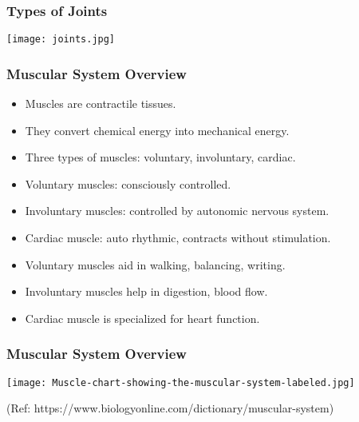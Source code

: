 \begin{frame}[fragile]\frametitle{Types of Joints}

		\begin{center}
		\texttt{[image: joints.jpg]} 
		\end{center}	

\end{frame}

\begin{frame}[fragile]\frametitle{Muscular System Overview}

      \begin{itemize}
		\item Muscles are contractile tissues.
		\item They convert chemical energy into mechanical energy.
		\item Three types of muscles: voluntary, involuntary, cardiac.
		\item Voluntary muscles: consciously controlled.
		\item Involuntary muscles: controlled by autonomic nervous system.
		\item Cardiac muscle: auto rhythmic, contracts without stimulation.
		\item Voluntary muscles aid in walking, balancing, writing.
		\item Involuntary muscles help in digestion, blood flow.
		\item Cardiac muscle is specialized for heart function.
	  \end{itemize}

\end{frame}

\begin{frame}[fragile]\frametitle{Muscular System Overview}

		\begin{center}
		\texttt{[image: Muscle-chart-showing-the-muscular-system-labeled.jpg]}
						
		{\tiny (Ref: https://www.biologyonline.com/dictionary/muscular-system)}			
		\end{center}	

\end{frame}


